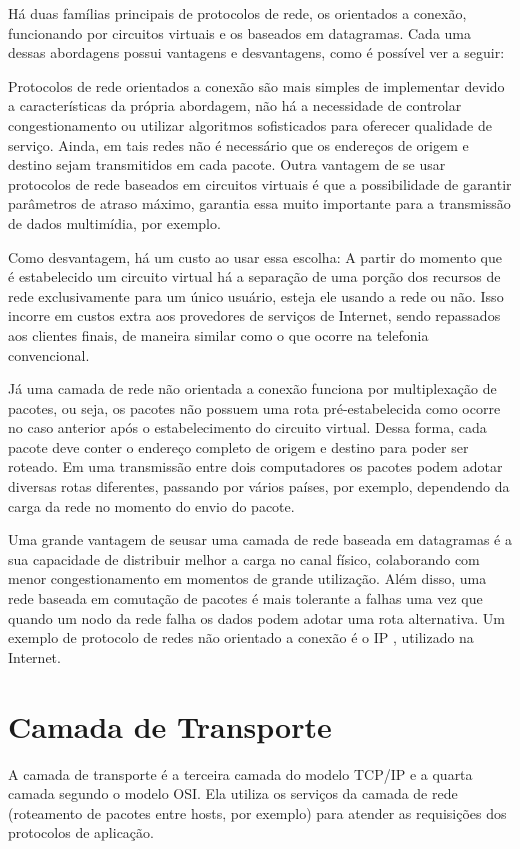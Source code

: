 \documentclass[brazil,times,12pt]{abnt}
\begin{document}
	Há duas famílias principais de protocolos de rede, os orientados a conexão,
	funcionando por circuitos virtuais e os baseados em datagramas. Cada uma dessas
	abordagens possui vantagens e desvantagens, como é possível ver a seguir:
	
	Protocolos de rede orientados a conexão são mais simples de implementar devido
	a características da própria abordagem, não há a necessidade de controlar
	congestionamento ou utilizar algoritmos sofisticados para oferecer qualidade de
	serviço. Ainda, em tais redes não é necessário que os endereços de origem e
	destino sejam transmitidos em cada pacote. Outra vantagem de se usar
	protocolos de rede baseados em circuitos virtuais é que a possibilidade de
	garantir parâmetros de atraso máximo, garantia essa muito importante para a
	transmissão de dados multimídia, por exemplo. \cite{wiki:network-layer}
	
	Como desvantagem, há um custo ao usar essa escolha: A partir do momento que é
	estabelecido um circuito virtual há a separação de uma porção dos recursos de
	rede exclusivamente para um único usuário, esteja ele usando a rede ou não.
	Isso incorre em custos extra aos provedores de serviços de Internet, sendo
	repassados aos clientes finais, de maneira similar como o que ocorre na
	telefonia convencional.
	
	Já uma camada de rede não orientada a conexão funciona por multiplexação de
	pacotes, ou seja, os pacotes não possuem uma rota pré-estabelecida como ocorre
	no caso anterior após o estabelecimento do circuito virtual. Dessa forma, cada
	pacote deve conter o endereço completo de origem e destino para poder ser
	roteado. Em uma transmissão entre dois computadores os pacotes podem adotar
	diversas rotas diferentes, passando por vários países, por exemplo, dependendo
	da carga da rede no momento do envio do pacote.
	
	Uma grande vantagem de seusar uma camada de rede baseada em datagramas é a sua
	capacidade de distribuir melhor a carga no canal físico, colaborando com menor
	congestionamento em momentos de grande utilização. Além disso, uma rede
	baseada em comutação de pacotes é mais tolerante a falhas uma vez que quando
	um nodo da rede falha os dados podem adotar uma rota alternativa. Um exemplo
	de protocolo de redes não orientado a conexão é o IP
	\cite{wiki:internet-layer}, utilizado na Internet.

\section*{Camada de Transporte}
	A camada de transporte é a terceira camada do modelo TCP/IP e a quarta camada
	segundo o modelo OSI. Ela utiliza os serviços da camada de rede (roteamento de
	pacotes entre hosts, por exemplo) para atender as requisições dos protocolos de
	aplicação.
	
\end{document}
